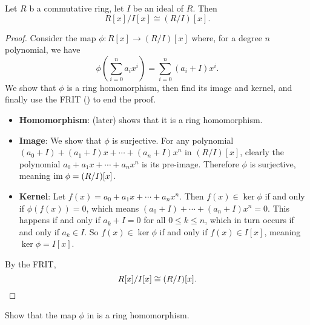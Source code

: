 \begin{proposition}\label{prop-polynomial-ring-quotient-ideal-polynomial-ring-cong-quotient-polynomial-ring}
    Let $R$ b a commutative ring, let $I$ be an ideal of $R$. Then
    \[
        R[x]/I[x] \cong (R/I)[x].
    \]
\end{proposition}
\begin{proof}
    Consider the map $\phi: R[x] \to (R/I)[x]$ where, for a degree $n$ polynomial, we have
    \[
        \phi\left(\sum_{i=0}^na_ix^i\right) = \sum_{i=0}^n (a_i+I)x^i.
    \]
    We show that $\phi$ is a ring homomorphism, then find its image and kernel, and finally use the FRIT () to end the proof.
    \begin{itemize}
        \item \textbf{Homomorphism}:  (later) shows that it is a ring homomorphism.
        
        \item \textbf{Image}: We show that $\phi$ is surjective. For any polynomial $(a_0+I) + (a_1+I)x + \cdots + (a_n+I)x^n$ in $(R/I)[x]$, clearly the polynomial $a_0 + a_1x + \cdots + a_nx^n$ is its pre-image. Therefore $\phi$ is surjective, meaning $\mathrm{im}\; \phi = (R/I)[x]$.
        
        \item \textbf{Kernel}: Let $f(x) = a_0 + a_1x + \cdots + a_nx^n$. Then $f(x) \in \ker\phi$ if and only if $\phi(f(x)) = 0$, which means $(a_0+I) + \cdots + (a_n+I)x^n = 0$. This happens if and only if $a_k + I = 0$ for all $0 \leq k \leq n$, which in turn occurs if and only if $a_k \in I$. So $f(x) \in \ker\phi$ if and only if $f(x) \in I[x]$, meaning $\ker\phi = I[x]$.
    \end{itemize}
    By the FRIT,
    \[
        R[x]/I[x] \cong (R/I)[x].\qedhere
    \]
\end{proof}

\begin{exercise}\label{exercise-polynomial-ring-maps-to-quotient-polynomial-ring-is-homomorphism}
    Show that the map $\phi$ in  is a ring homomorphism.
\end{exercise}

